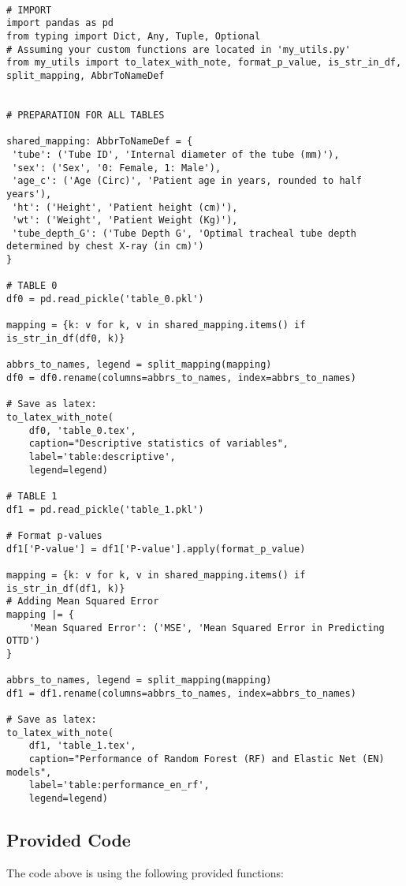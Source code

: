 \documentclass[11pt]{article}
\begin{document}
\begin{verbatim}

# IMPORT
import pandas as pd
from typing import Dict, Any, Tuple, Optional
# Assuming your custom functions are located in 'my_utils.py'
from my_utils import to_latex_with_note, format_p_value, is_str_in_df, split_mapping, AbbrToNameDef 


# PREPARATION FOR ALL TABLES

shared_mapping: AbbrToNameDef = {
 'tube': ('Tube ID', 'Internal diameter of the tube (mm)'),
 'sex': ('Sex', '0: Female, 1: Male'),
 'age_c': ('Age (Circ)', 'Patient age in years, rounded to half years'),
 'ht': ('Height', 'Patient height (cm)'),
 'wt': ('Weight', 'Patient Weight (Kg)'),
 'tube_depth_G': ('Tube Depth G', 'Optimal tracheal tube depth determined by chest X-ray (in cm)')
}

# TABLE 0
df0 = pd.read_pickle('table_0.pkl')

mapping = {k: v for k, v in shared_mapping.items() if is_str_in_df(df0, k)} 

abbrs_to_names, legend = split_mapping(mapping)
df0 = df0.rename(columns=abbrs_to_names, index=abbrs_to_names)

# Save as latex:
to_latex_with_note(
    df0, 'table_0.tex',
    caption="Descriptive statistics of variables", 
    label='table:descriptive', 
    legend=legend)

# TABLE 1
df1 = pd.read_pickle('table_1.pkl')

# Format p-values
df1['P-value'] = df1['P-value'].apply(format_p_value)

mapping = {k: v for k, v in shared_mapping.items() if is_str_in_df(df1, k)} 
# Adding Mean Squared Error 
mapping |= {
    'Mean Squared Error': ('MSE', 'Mean Squared Error in Predicting OTTD')
}

abbrs_to_names, legend = split_mapping(mapping)
df1 = df1.rename(columns=abbrs_to_names, index=abbrs_to_names)

# Save as latex:
to_latex_with_note(
    df1, 'table_1.tex',
    caption="Performance of Random Forest (RF) and Elastic Net (EN) models", 
    label='table:performance_en_rf', 
    legend=legend)

\end{verbatim}

\subsection{Provided Code}
The code above is using the following provided functions:
\end{document}
